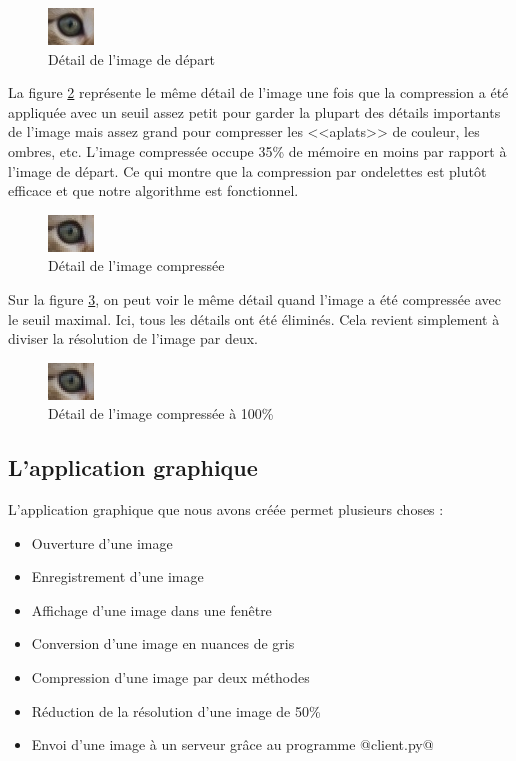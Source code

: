 \documentclass{article}
\begin{document}
\begin{figure}[!h]
\centering
\includegraphics[scale=2]{images/chat_orig.jpg}
\caption{Détail de l'image de départ}
\label{dchat}
\end{figure}

La figure \ref{chat2} représente le même détail de l'image une fois que la compression a été appliquée avec un seuil assez petit pour garder la plupart des détails importants de l'image mais assez grand pour compresser les <<aplats>> de couleur, les ombres, etc. L'image compressée occupe 35\% de mémoire en moins par rapport à l'image de départ. Ce qui montre que la compression par ondelettes est plutôt efficace et que notre algorithme est fonctionnel.

\begin{figure}[!h]
\centering
\includegraphics[scale=2]{images/chat_compress.jpg}
\caption{Détail de l'image compressée}
\label{chat2}
\end{figure}

Sur la figure \ref{chat3}, on peut voir le même détail quand l'image a été compressée avec le seuil maximal. Ici, tous les détails ont été éliminés. Cela revient simplement à diviser la résolution de l'image par deux.

\begin{figure}[!h]
\centering
\includegraphics[scale=2]{images/chat_compress255.jpg}
\caption{Détail de l'image compressée à 100\%}
\label{chat3}
\end{figure}

\cleardoublepage

\subsection{L'application graphique}

L'application graphique que nous avons créée permet plusieurs choses :

\begin{itemize}
\item Ouverture d'une image
\item Enregistrement d'une image
\item Affichage d'une image dans une fenêtre
\item Conversion d'une image en nuances de gris
\item Compression d'une image par deux méthodes
\item Réduction de la résolution d'une image de 50\%
\item Envoi d'une image à un serveur grâce au programme @client.py@
\end{itemize}
\end{document}
